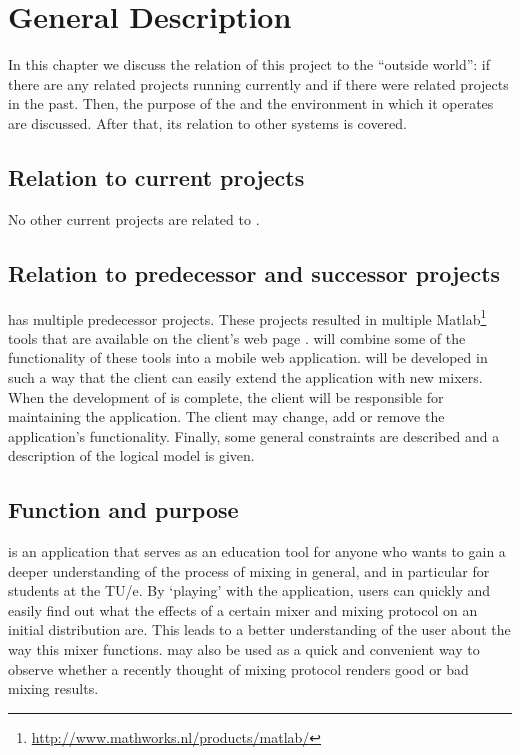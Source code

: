 \chapter{General Description}
\label{chap:gendesc}
In this chapter we discuss the relation of this project to the ``outside world'': if there are any related projects running currently and if there were related projects in the past. Then, the purpose of the \applicationname{} and the environment in which it operates are discussed. After that, its relation to other systems is covered.

\section{Relation to current projects}
\label{sec:curproj}
No other current projects are related to \projectname{}.

\section{Relation to predecessor and successor projects}
\label{sec:predsuc}
\projectname{} has multiple predecessor projects. These projects resulted in multiple Matlab\footnote{\url{http://www.mathworks.nl/products/matlab/}} tools that are available on the client's web page \cite{clientpage}. \projectname{} will combine some of the functionality of these tools into a mobile web application. \projectname{} will be developed in such a way that the client can easily extend the application with new mixers. When the development of \projectname{} is complete, the client will be responsible for maintaining the application. The client may change, add or remove the application's functionality. Finally, some general constraints are described and a description of the logical model is given.

\section{Function and purpose}
\label{sec:functpurp}
\projectname{} is an application that serves as an education tool for anyone who wants to gain a deeper understanding of the process of mixing in general, and in particular for students at the TU/e. By `playing' with the application, users can quickly and easily find out what the effects of a certain mixer and mixing protocol on an initial distribution are. This leads to a better understanding of the user about the way this mixer functions. \projectname{} may also be used as a quick and convenient way to observe whether a recently thought of mixing protocol renders good or bad mixing results. 

